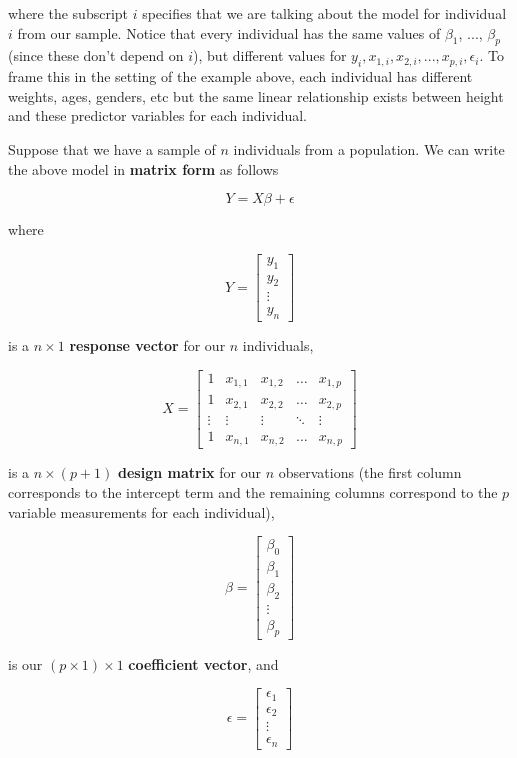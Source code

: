 where the subscript $i$ specifies that we are talking about the model for individual $i$ from our sample. Notice that every individual has the same values of $\beta_1$, ..., $\beta_p$ (since these don't depend on $i$), but different values for $y_i, x_{1, i}, x_{2, i}, ..., x_{p, i}, \epsilon_i$. To frame this in the setting of the example above, each individual has different weights, ages, genders, etc but the same linear relationship exists between height and these predictor variables for each individual. 

Suppose that we have a sample of $n$ individuals from a population. We can write the above model in {\bf matrix form} as follows

$$Y = X \beta + \epsilon$$

where 

$$Y =\left[ \begin{array}{c}y_1\\ y_2 \\   \vdots\\   y_n\end{array} \right]$$ 

is a $n \times 1$ {\bf response vector} for our $n$ individuals, 

$$X =\left[ \begin{array}{ccccc}
1 & x_{1, 1} & x_{1, 2} & \dots & x_{1, p}\\
1 & x_{2, 1} & x_{2, 2} & \dots & x_{2, p}\\
\vdots &  \vdots & \vdots & \ddots & \vdots \\
 1 & x_{n, 1} & x_{n, 2} & \dots & x_{n, p} \end{array}\right]$$


is a $n \times (p + 1)$ {\bf design matrix} for our $n$ observations (the first column corresponds to the intercept term and the remaining columns correspond to the $p$ variable measurements for each individual),

$$\beta = \left[ \begin{array}{c}\beta_0 \\ \beta_1\\ \beta_2 \\   \vdots\\   \beta_p\end{array} \right]$$ 

is our $(p \times 1) \times 1$ {\bf coefficient vector}, and

$$\epsilon = \left[ \begin{array}{c}\epsilon_1\\ \epsilon_2 \\   \vdots\\   \epsilon_n\end{array} \right]$$

